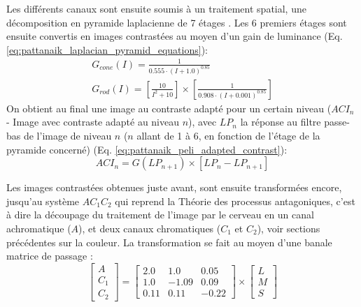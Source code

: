 	\par Les différents canaux sont ensuite soumis à un traitement spatial, une décomposition en pyramide laplacienne de 7 étages \citep{burt_laplacian_1983}. Les 6 premiers étages sont ensuite convertis en images contrastées \citep{peli_contrast_1990} au moyen d'un gain de luminance (Eq. \ref{eq:pattanaik_laplacian_pyramid_equations}):
	\begin{equation}
		\begin{array}{c}
		G_{cone}(I) = \frac{1}{0.555 \cdot (I+1.0)^{0.85}}\\
		G_{rod}(I) = \left[ \frac{10}{I^2+10} \right] \times \left[ \frac{1}{0.908 \cdot (I+0.001)^{0.85}} \right]
		\end{array}
		\label{eq:pattanaik_laplacian_pyramid_equations}
	\end{equation}
	On obtient au final une image au contraste adapté pour un certain niveau ($ACI_n$ - Image avec contraste adapté au niveau $n$), avec $LP_n$ la réponse au filtre passe-bas de l'image de niveau $n$ ($n$ allant de 1 à 6, en fonction de l'étage de la pyramide concerné) (Eq. \ref{eq:pattanaik_peli_adapted_contrast}):
	\begin{equation}
		ACI_n = G(LP_{n+1}) \times \left[ LP_n - LP_{n+1} \right]
		\label{eq:pattanaik_peli_adapted_contrast}
	\end{equation}
	
	\par Les images contrastées obtenues juste avant, sont ensuite transformées encore, jusqu'au système $AC_1C_2$ qui reprend la Théorie des processus antagoniques, c'est à dire la découpage du traitement de l'image par le cerveau en un canal achromatique ($A$), et deux canaux chromatiques ($C_1$ et $C_2$), voir sections précédentes sur la couleur. La transformation se fait au moyen d'une banale matrice de passage \citep{hunt_reproduction_1995,fairchild_color_1998}:
	\begin{equation}
		\left[ \begin{array}{c}A\\ C_1\\ C_2\end{array} \right] = \left[ \begin{array}{ccc}
		2.0 & 1.0 & 0.05\\
		1.0 & -1.09 & 0.09\\
		0.11 & 0.11 & -0.22		
		\end{array} \right] \times \left[ \begin{array}{c}L\\ M\\ S\end{array} \right]
		\label{eq:pattanaik_linear_transform_lms_to_ac1c2}
	\end{equation}
	

